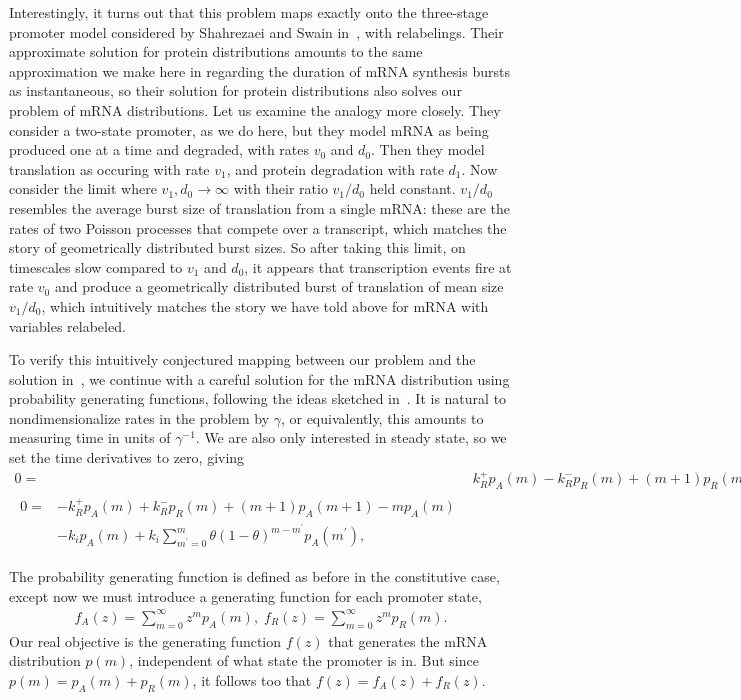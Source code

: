 \documentclass[12pt]{article}%
\begin{document}
Interestingly, it turns out that this problem maps exactly onto the
three-stage promoter model considered by
Shahrezaei and Swain in~\cite{Shahrezaei2008}, with relabelings.
Their approximate solution for protein distributions amounts to
the same approximation we make here in regarding the duration
of mRNA synthesis bursts as instantaneous, so their solution
for protein distributions also solves our problem of mRNA distributions.
Let us examine the analogy more closely.
They consider a two-state promoter, as we do here, but they model
mRNA as being produced one at a time and degraded, with rates
$v_0$ and $d_0$.
Then they model translation as occuring with rate $v_1$,
and protein degradation with rate $d_1$.
Now consider the limit where $v_1, d_0\rightarrow\infty$ with
their ratio $v_1/d_0$ held constant.
$v_1/d_0$ resembles the average burst size of translation from a single
mRNA: these are the rates of two Poisson processes that compete over a
transcript, which matches the story of geometrically distributed burst sizes.
So after taking this limit, on timescales slow compared to $v_1$ and $d_0$,
it appears that transcription events fire at rate $v_0$ and produce a
geometrically distributed burst of translation of mean size $v_1/d_0$,
which intuitively matches the story we have told above for mRNA
with variables relabeled.

To verify this intuitively conjectured mapping between our problem and
the solution in~\cite{Shahrezaei2008}, we continue with a careful
solution for the mRNA distribution using probability generating functions,
following the ideas sketched in~\cite{Shahrezaei2008}.
It is natural to nondimensionalize rates in the problem by $\gamma$,
or equivalently, this amounts to measuring time in units of $\gamma^{-1}$.
We are also only interested in steady state, so we set the time
derivatives to zero, giving
\begin{align}
0 =& k_R^+ p_A(m) - k_R^- p_R(m) + (m+1) p_R(m+1) - m p_R(m)
\\
\begin{split}
0 =& - k_R^+ p_A(m) + k_R^- p_R(m) + (m+1) p_A(m+1) - m p_A(m) 
\\
&- k_i p_A(m) + k_i \sum_{m^\prime=0}^m \theta(1-\theta)^{m-m^\prime} p_A(m^\prime),
\end{split}
\end{align}
        
The probability generating function is defined as before in the
constitutive case, except now we must introduce a generating function
for each promoter state,
\begin{align}
f_A(z) = \sum_{m=0}^\infty z^m p_A(m),
\;
f_R(z) = \sum_{m=0}^\infty z^m p_R(m).
\end{align}
Our real objective is the generating function $f(z)$ that generates
the mRNA distribution $p(m)$, independent of what state the promoter is in.
But since $p(m) = p_A(m) + p_R(m)$, it follows too that $f(z) = f_A(z) + f_R(z)$.
\end{document}
